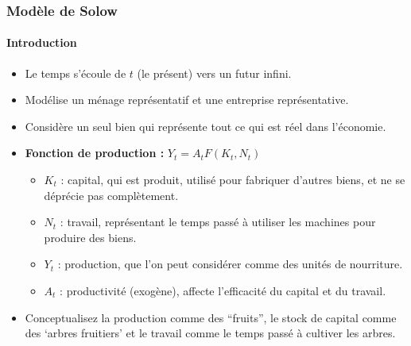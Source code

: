 \documentclass{beamer}
\begin{document}
\begin{frame}
    \frametitle{Modèle de Solow}
    \framesubtitle{Introduction}
    \begin{itemize}
        \item Le temps s'écoule de \( t \) (le présent) vers un futur infini.
        \item Modélise un ménage représentatif et une entreprise représentative.
        \item Considère un seul bien qui représente tout ce qui est réel dans l'économie.\pause
        \item \textbf{Fonction de production :} \( Y_t = A_t F(K_t, N_t) \)
        \begin{itemize}
            \item \( K_t \) : capital, qui est produit, utilisé pour fabriquer d'autres biens, et ne se déprécie pas complètement.
            \item \( N_t \) : travail, représentant le temps passé à utiliser les machines pour produire des biens.
            \item \( Y_t \) : production, que l'on peut considérer comme des unités de nourriture.
            \item \( A_t \) : productivité (exogène), affecte l'efficacité du capital et du travail.
        \end{itemize}
        \pause
        \item 
        Conceptualisez la production comme des \enquote{fruits}, le stock de capital comme des \enquote*{arbres fruitiers} 
        et le travail comme le temps passé à cultiver les arbres.
    \end{itemize}
\end{frame}
\end{document}
